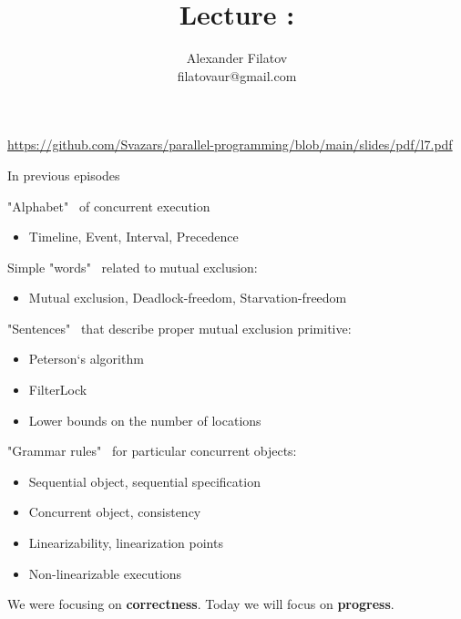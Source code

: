 


\title[]{Lecture \foundationsPlusNum: \foundationsPlusTopic}
\subtitle[]{\foundationsPlusKey}
\author[]{Alexander Filatov\\ filatovaur@gmail.com}

\date{}



\begin{frame}
  \titlepage
  \url{https://github.com/Svazars/parallel-programming/blob/main/slides/pdf/l7.pdf}
\end{frame}


\begin{frame}{In previous episodes}

"Alphabet" \ of concurrent execution
\begin{itemize}
  \item Timeline, Event, Interval, Precedence
\end{itemize}

Simple "words" \ related to mutual exclusion:
\begin{itemize}
  \item Mutual exclusion, Deadlock-freedom, Starvation-freedom
\end{itemize}

"Sentences" \ that describe proper mutual exclusion primitive:
\begin{itemize}
  \item Peterson`s algorithm
  \item FilterLock
  \item Lower bounds on the number of locations
\end{itemize}

"Grammar rules" \ for particular concurrent objects:
\begin{itemize}
  \item Sequential object, sequential specification
  \item Concurrent object, consistency
  \item Linearizability, linearization points
  \item Non-linearizable executions
\end{itemize}

\pause
We were focusing on \textbf{correctness}. Today we will focus on \textbf{progress}.

\end{frame}


